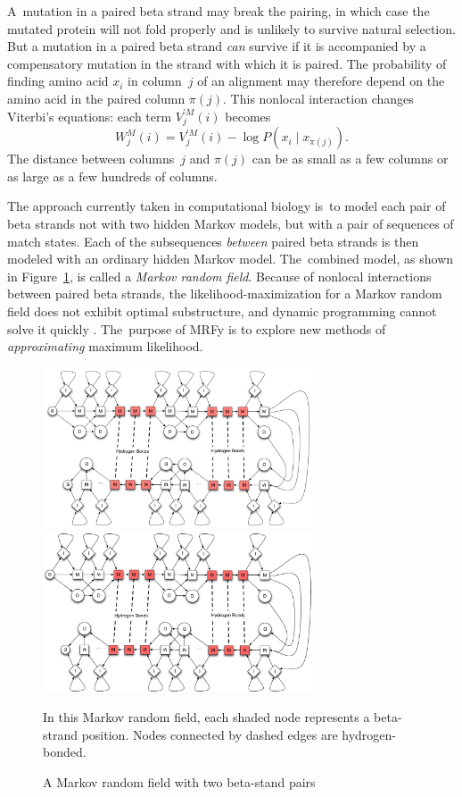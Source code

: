 \documentclass[preprint,nonatbib,blockstyle,nocopyrightspace,times]{sigplanconf}
\newcommand\pairedwith[1]{{\pi(#1)}}
\newcommand\figref[1]{Figure~\ref{#1}}
\let\cite\citep
\begin{document}
A~mutation in a paired beta strand may break the pairing, in which
 case the mutated protein will not fold properly and is unlikely to
 survive natural selection.
But a mutation in a paired beta strand \emph{can} survive if it is
 accompanied by a compensatory mutation in the strand with which it is
 paired. 
The probability of finding amino acid $x_i$ in column~$j$ of an alignment may
 therefore depend on the amino acid in the paired column
 $\pairedwith j$.
This nonlocal interaction changes
Viterbi's equations:
each term $V_{j}^{\prime M}(i)$ becomes
$$W_{j}^{M}(i) = V_{j}^{\prime M}(i) - \log P(x_{i} \mid x_{\pairedwith j}).$$
The distance between columns~$j$ and $\pairedwith j$ can be as small
 as a few columns or as large as a few hundreds of columns.


The approach currently taken in computational biology
is~to model each pair of beta strands not with two hidden Markov
models, 
but with a pair of sequences of match states.
Each of the subsequences \emph{between} paired beta strands is then
modeled with an ordinary hidden Markov model.
The~combined model, as shown in \figref{mrf}, is called a
\textit{Markov random field}. 
Because of nonlocal interactions between paired beta strands, 
the likelihood-maximization for a Markov random field does not
 exhibit optimal substructure, and dynamic
 programming cannot solve it quickly \cite{Menke:2010ti,Daniels:2012}.
The~purpose of MRFy is to explore new methods of \emph{approximating}
maximum likelihood.


\begin{figure}
\ifpdfmadness
\centerline{\includegraphics[width=8cm]{mrf_interleave_diagram.pdf}} 
\else
\centerline{\includegraphics[width=8cm]{mrf_interleave_diagram.eps}} 
\fi
In this Markov random field,
each shaded node represents a beta-strand position.
Nodes connected by dashed edges are hydrogen-bonded.

\caption{A Markov random field with two beta-stand pairs}
\label{mrf} 
\end{figure}
\end{document}

